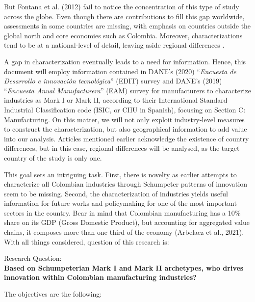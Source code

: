 \documentclass[12pt,a4paper]{article}
\begin{document}
But Fontana et al. (2012) fail to notice the concentration of this type of study across the globe. Even though there are contributions to fill this gap worldwide, assessments in some countries are missing, with emphasis on countries outside the global north and core economies such as Colombia. Moreover, characterizations tend to be at a national-level of detail, leaving aside regional differences .

A gap in characterization eventually leads to a need for information. Hence, this document will employ information contained in DANE's (2020) “\textit{Encuesta de Desarrollo e innovación tecnológica}” (EDIT) survey and DANE's (2019) “\textit{Encuesta Anual Manufacturera}” (EAM) survey for manufacturers to characterize industries as Mark I or Mark II, according to their International Standard Industrial Classification code (ISIC, or CIIU in Spanish), focusing on Section C: Manufacturing. On this matter, we will not only exploit industry-level measures to construct the characterization, but also geographical information to add value into our analysis. Articles mentioned earlier acknowledge the existence of country differences, but in this case, regional differences will be analysed, as the target country of the study is only one.

This goal sets an intriguing task. First, there is novelty as earlier attempts to characterize all Colombian industries through Schumpeter patterns of innovation seem to be missing. Second, the characterization of industries yields useful information for future works and policymaking for one of the most important sectors in the country. Bear in mind that Colombian manufacturing has a 10\% share on its GDP (Gross Domestic Product), but accounting for aggregated value chains, it composes more than one-third of the economy (Arbelaez et al., 2021). With all things considered, question of this research is: 



\begin{center}
	Research Question: \\  \textbf{Based on Schumpeterian Mark I and Mark II archetypes, who drives innovation within Colombian manufacturing industries?}
\end{center}

The objectives are the following:
\end{document}
